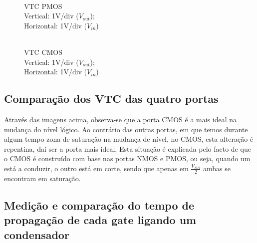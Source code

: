 \documentclass[pdftex,12pt,a4paper]{report}
\begin{document}
\begin{figure}[!htb]
  \centerline{}
  \caption{\\VTC PMOS \\Vertical: 1V/div ($V_{out}$); \\Horizontal: 1V/div ($V_{in}$)}
\endminipage\hfill
{}
  \centerline{}
  \caption{\\VTC CMOS \\Vertical: 1V/div ($V_{out}$); \\Horizontal: 1V/div ($V_{in}$)}
\endminipage\hfill
\end{figure}

\subsection{Comparação dos VTC das quatro portas}
Através das imagens acima, observa-se que a porta CMOS é a mais ideal na mudança do nível lógico. Ao contrário das outras portas, em que temos durante algum tempo zona de saturação na mudança de nível, no CMOS, esta alteração é repentina, daí ser a porta mais ideal. Esta situação é explicada pelo facto de que o CMOS é construído com base nas portas NMOS e PMOS, ou seja, quando um está a conduzir, o outro está em corte, sendo que apenas em  $\frac{V_{DD}}{2}$ ambas se encontram em saturação.
\newpage
\subsection{Medição e comparação do tempo de propagação de cada gate ligando um condensador}
\end{document}
